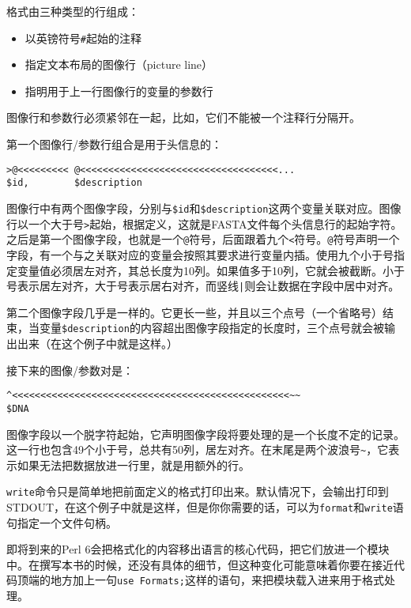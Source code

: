 格式由三种类型的行组成：

\begin{itemize}
  \item 以英镑符号\verb|#|起始的注释
  \item 指定文本布局的图像行（picture line）
  \item 指明用于上一行图像行的变量的参数行
\end{itemize}

图像行和参数行必须紧邻在一起，比如，它们不能被一个注释行分隔开。

第一个图像行/参数行组合是用于头信息的：

\begin{lstlisting}
>@<<<<<<<<< @<<<<<<<<<<<<<<<<<<<<<<<<<<<<<<<<<<<...
$id,        $description
\end{lstlisting}

图像行中有两个图像字段，分别与\verb|$id|和\verb|$description|这两个变量关联对应。图像行以一个大于号\verb|>|起始，根据定义，这就是FASTA文件每个头信息行的起始字符。之后是第一个图像字段，也就是一个\verb|@|符号，后面跟着九个\verb|<|符号。\verb|@|符号声明一个字段，有一个与之关联对应的变量会按照其要求进行变量内插。使用九个小于号指定变量值必须居左对齐，其总长度为10列。如果值多于10列，它就会被截断。小于号表示居左对齐，大于号表示居右对齐，而竖线\verb=|=则会让数据在字段中居中对齐。

第二个图像字段几乎是一样的。它更长一些，并且以三个点号（一个省略号）结束，当变量\verb|$description|的内容超出图像字段指定的长度时，三个点号就会被输出出来（在这个例子中就是这样。）

接下来的图像/参数对是：

\begin{lstlisting}
^<<<<<<<<<<<<<<<<<<<<<<<<<<<<<<<<<<<<<<<<<<<<<<<<<~~
$DNA
\end{lstlisting}

图像字段以一个脱字符起始，它声明图像字段将要处理的是一个长度不定的记录。这一行也包含49个小于号，总共有50列，居左对齐。在末尾是两个波浪号\verb|~|，它表示如果无法把数据放进一行里，就是用额外的行。

\verb|write|命令只是简单地把前面定义的格式打印出来。默认情况下，会输出打印到STDOUT，在这个例子中就是这样，但是你你需要的话，可以为\verb|format|和\verb|write|语句指定一个文件句柄。

即将到来的Perl 6会把格式化的内容移出语言的核心代码，把它们放进一个模块中。在撰写本书的时候，还没有具体的细节，但这种变化可能意味着你要在接近代码顶端的地方加上一句\verb|use Formats;|这样的语句，来把模块载入进来用于格式处理。

